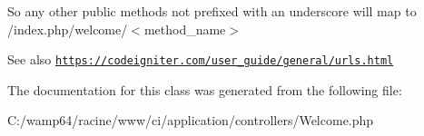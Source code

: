 So any other public methods not prefixed with an underscore will map to /index.php/welcome/$<$method\+\_\+name$>$ \begin{DoxySeeAlso}{See also}
\href{https://codeigniter.com/user_guide/general/urls.html}{\tt https\+://codeigniter.\+com/user\+\_\+guide/general/urls.\+html} 
\end{DoxySeeAlso}


The documentation for this class was generated from the following file\+:\begin{DoxyCompactItemize}
\item 
C\+:/wamp64/racine/www/ci/application/controllers/Welcome.\+php\end{DoxyCompactItemize}
